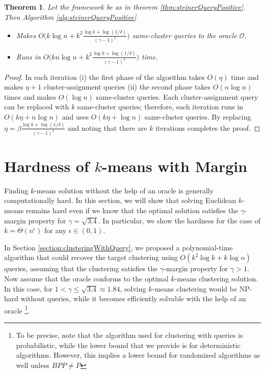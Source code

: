 \documentclass[12pt]{article}
\newcommand{\mc}{\mathcal}
\newtheorem{theorem}{Theorem}
\begin{document}
\begin{theorem}
\label{thm:steinerQueryPositiveComplexity}
Let the framework be as in theorem \ref{thm:steinerQueryPositive}. Then Algorithm \ref{alg:steinerQueryPositive} 
\begin{itemize}[nolistsep,noitemsep]
\item Makes $O\big(k\log n + k^2\frac{\log k + \log (1/\delta)}{(\gamma - 1)^4}\big)$ same-cluster queries to the oracle $\mc O$.
\item Runs in $O\big(kn\log n + k^2\frac{\log k + \log (1/\delta)}{(\gamma - 1)^4}\big)$ time.
\end{itemize}
\end{theorem}

\begin{proof}
In each iteration (i) the first phase of the algorithm takes $O(\eta)$ time and makes $\eta+1$ cluster-assignment queries (ii) the second phase takes $O(n\log n)$ times and makes $O(\log n)$ same-cluster queries. Each cluster-assignment query can be replaced with $k$ same-cluster queries; therefore, each iteration runs in $O(k\eta + n\log n)$ and uses $O(k\eta + \log n)$ same-cluster queries. By replacing $\eta = \beta\frac{\log k + \log(1/\delta)}{(\gamma-1)^4}$ and noting that there are $k$ iterations completes the proof.
\end{proof}

\section{Hardness of $k$-means with Margin}
\label{section:lowerBounds}

Finding $k$-means solution without the help of an oracle is generally computationally hard. In this section, we will show that solving Euclidean $k$-means remains hard even if we know that the optimal solution satisfies the $\gamma$-margin property for $\gamma=\sqrt{3.4}$. In particular, we show the hardness for the case of $k=\Theta(n^\epsilon)$ for any $\epsilon\in (0,1)$.


In Section \ref{section:clusteringWithQuery}, we proposed a polynomial-time algorithm that could recover the target clustering using $O(k^2\log k +k\log n)$ queries, assuming that the clustering satisfies the $\gamma$-margin property for $\gamma>1$. Now assume that the oracle conforms to the optimal $k$-means clustering solution. In this case, for $1<\gamma\le \sqrt{3.4} \approx 1.84$, solving $k$-means clustering would be NP-hard without queries, while it becomes efficiently solvable with the help of an oracle \footnote{To be precise, note that the algorithm used for clustering with queries is probabilistic, while the lower bound that we provide is for deterministic algorithms. However, this implies a lower bound for randomized algorithms as well unless $BPP\neq P$}. 
\end{document}

